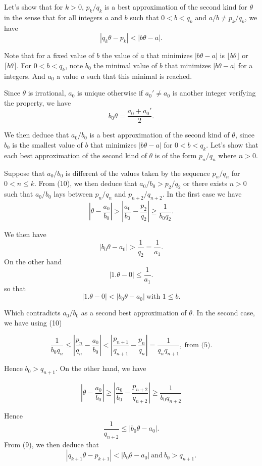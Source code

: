 \documentclass[a4paper,12pt]{article}
\begin{document}
Let's show that for $k> 0$, $p_k/q_k$ is a best approximation of the
second kind for $\theta$ in the sense that for all integers $a$ and
$b$ such that $0 < b < q_k$ and $a/b \not= p_k/q_k$, we have
\[ |q_k \theta - p_k| < |b \theta - a|.\]

Note that for a fixed value of $b$ the value of $a$ that minimizes $|b
\theta - a|$ is $\lfloor b \theta\rfloor$ or $\lceil b \theta\rceil$.
For $0 < b < q_k$, note $b_0$ the minimal value of $b$ that minimizes
$|b\theta-a|$ for a integers.  And $a_0$ a value $a$ such that this
minimal is reached.

Since $\theta$ is irrational, $a_0$ is unique otherwise if $a_0' \not=
a_0$ is another integer verifying the property, we have
\[ b_0\theta = \frac{a_0 + a_0'}{2}.\]

We then deduce that $a_0/b_0$ is a best approximation of the second
kind of $\theta$, since $b_0$ is the smallest value of $b$ that
minimizes $|b\theta - a|$ for $0 < b < q_k$.  Let's show that each
best approximation of the second kind of $\theta$ is of the form
$p_n/q_n$ where $n>0$.

Suppose that $a_0/b_0$ is different of the values taken by the
sequence $p_n/q_n$ for $0<n\le k$.  From (10), we then deduce that
$a_0/b_0 > p_2/q_2$ or there exists $n>0$ such that $a_0/b_0$ lays
between $p_n/q_n$ and $p_{n+2}/q_{n+2}$.  In the first case we have
\[ \left| \theta - \frac{a_0}{b_0} \right| > \left| \frac{a_0}{b_0} -
\frac{p_2}{q_2}\right| \ge \frac{1}{b_0 q_2}.\]

We then have
\[ |b_0\theta - a_0| > \frac{1}{q_2} = \frac{1}{a_1}.\]
On the other hand
\[ |1.\theta - 0 | \le \frac{1}{a_1}.\]
so that
\[ |1. \theta - 0| < |b_0 \theta - a_0|\ \mbox{with $1\le b$}.\]

Which contradicts $a_0/b_0$ as a second best approximation of
$\theta$. In the second case, we have using (10)

\[ \frac{1}{b_0q_n}\le \left|\frac{p_n}{q_n} - \frac{a_0}{b_0}\right| <
\left|\frac{p_{n+1}}{q_{n+1}} - \frac{p_n}{q_n}\right| =
\frac{1}{q_nq_{n+1}},\ \mbox{from (5)}.\]

Hence $b_0 > q_{n+1}$.  On the other hand, we have

\[ \left| \theta - \frac{a_0}{b_0} \right| \ge \left|
\frac{a_0}{b_0} - \frac{p_{n+2}}{q_{n+2}}\right| \ge
\frac{1}{b_0 q_{n+2}}\]

Hence \[ \frac{1}{q_{n+2}} \le |b_0 \theta - a_0|.\]
From (9), we then deduce that
\[ |q_{k+1}\theta - p_{k+1}| < |b_0\theta - a_0|\ \mbox{and}\ b_0>q_{n+1}.\]
\end{document}
